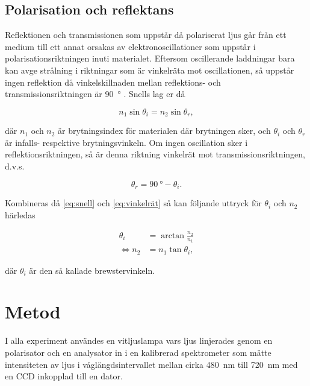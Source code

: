 \documentclass[a4paper]{article}
\begin{document}
\subsection{Polarisation och reflektans}

Reflektionen och transmissionen som uppstår då polariserat ljus går från ett medium till ett annat orsakas av elektronoscillationer som uppstår i polarisationsriktningen inuti materialet. Eftersom oscillerande laddningar bara kan avge strålning i riktningar som är vinkelräta mot oscillationen, så uppstår ingen reflektion då vinkelskillnaden mellan reflektions- och transmissionsriktningen är \SI{90}{\degree} \cite[pp.~575--579]{pearsonIntroOpt}. Snells lag er då

\begin{equation}\label{eq:snell}
	n_1\sin{\theta_i} = n_2\sin{\theta_r},
\end{equation}

där $n_1$ och $n_2$ är brytningsindex för materialen där brytningen sker, och $\theta_i$ och $\theta_r$ är infalls- respektive brytningsvinkeln. Om ingen oscillation sker i reflektionsriktningen, så är denna riktning vinkelrät mot transmissionsriktningen, d.v.s.

\begin{equation}\label{eq:vinkelrät}
	\theta_r = \SI{90}{\degree} - \theta_i.
\end{equation}

Kombineras då \eqref{eq:snell} och \eqref{eq:vinkelrät} så kan följande uttryck för $\theta_i$ och $n_2$ härledas

\begin{align}
	\theta_i &= \arctan{\frac{n_2}{n_1}}\label{eq:brewster}\\
	\Leftrightarrow n_2 &= n_1\tan{\theta_i}\label{eq:n_brewster},
\end{align}

där $\theta_i$ är den så kallade brewstervinkeln.


\section{Metod}
  
  I alla experiment användes en vitljuslampa vars ljus linjerades genom en polarisator och en analysator in i en kalibrerad spektrometer som mätte intensiteten av ljus i våglängdsintervallet mellan cirka \SI{480}{\nano\meter} till \SI{720}{\nano\meter} med en CCD inkopplad till en dator.
  
\end{document}
